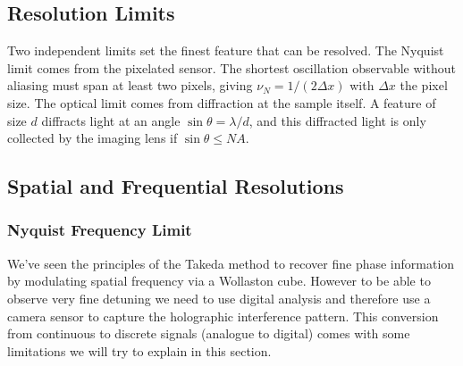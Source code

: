 \subsection{Resolution Limits}

Two independent limits set the finest feature that can be resolved. The Nyquist limit comes from the pixelated sensor. The shortest oscillation observable without aliasing must span at least two pixels, giving $\nu_N = 1/(2\Delta x)$ with $\Delta x$ the pixel size. The optical limit comes from diffraction at the sample itself. A feature of size $d$ diffracts light at an angle $\sin\theta = \lambda/d$, and this diffracted light is only collected by the imaging lens if $\sin\theta \le NA$.

\usetikzlibrary{decorations.pathmorphing, arrows.meta, angles, quotes}

\subsection{Spatial and Frequential Resolutions}
\subsubsection{Nyquist Frequency Limit}
We've seen the principles of the Takeda method to recover fine phase information by modulating spatial frequency via a Wollaston cube. However to be able to observe very fine detuning we need to use digital analysis and therefore use a camera sensor to capture the holographic interference pattern. 
This conversion from continuous to discrete signals (analogue to digital) comes with some limitations we will try to explain in this section.

